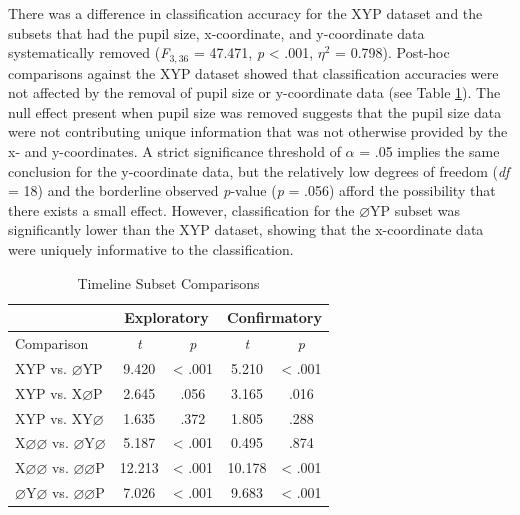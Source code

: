 \documentclass[
  english,
  man, donotrepeattitle,floatsintext]{apa6}
\begin{document}
There was a difference in classification accuracy for the XYP dataset and the subsets that had the pupil size, x-coordinate, and y-coordinate data systematically removed (\emph{F}\(_{3, 36}\) = 47.471, \emph{p} \textless{} .001, \textit{$\eta$}\(^{2}\) = 0.798). Post-hoc comparisons against the XYP dataset showed that classification accuracies were not affected by the removal of pupil size or y-coordinate data (see Table \ref{tab:timeline-parcellation-comparisons}). The null effect present when pupil size was removed suggests that the pupil size data were not contributing unique information that was not otherwise provided by the x- and y-coordinates. A strict significance threshold of \(\alpha\) = .05 implies the same conclusion for the y-coordinate data, but the relatively low degrees of freedom (\emph{df} = 18) and the borderline observed \emph{p}-value (\emph{p} = .056) afford the possibility that there exists a small effect. However, classification for the \(\varnothing\)YP subset was significantly lower than the XYP dataset, showing that the x-coordinate data were uniquely informative to the classification.

\begin{table}[!h]
    \centering
    \caption{Timeline Subset Comparisons}
    \label{tab:timeline-parcellation-comparisons}
    \begin{tabular}{l c c c c}
         & \multicolumn{2}{c}{Exploratory} & \multicolumn{2}{c}{Confirmatory} \\
        \hline
        Comparison & \textit{t} & \multicolumn{1}{c|}{\textit{p}} & \textit{t} & \textit{p} \\
        \hline
        XYP vs. $\varnothing$YP & 9.420 & \multicolumn{1}{c|}{< .001} & 5.210 & < .001 \\
        XYP vs. X$\varnothing$P & 2.645 & \multicolumn{1}{c|}{.056} & 3.165 & .016 \\
        XYP vs. XY$\varnothing$ & 1.635 & \multicolumn{1}{c|}{.372} & 1.805 & .288 \\
        X$\varnothing\varnothing$ vs. $\varnothing$Y$\varnothing$ & 5.187 & \multicolumn{1}{c|}{< .001} & 0.495 & .874 \\
        X$\varnothing\varnothing$ vs. $\varnothing\varnothing$P & 12.213 & \multicolumn{1}{c|}{< .001} & 10.178 & < .001 \\
        $\varnothing$Y$\varnothing$ vs. $\varnothing\varnothing$P & 7.026 & \multicolumn{1}{c|}{< .001} & 9.683 & < .001 \\
        \hline
    \end{tabular}
\end{table}
\end{document}
